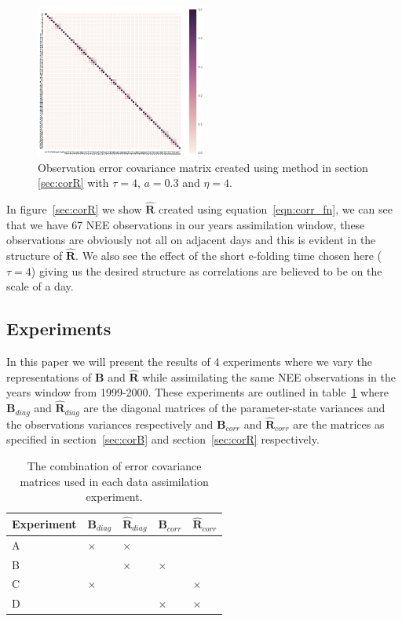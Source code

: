 \documentclass[11pt]{article}
\begin{document}
\begin{figure}[ht]
    \centering
    \includegraphics[width=0.5\textwidth]{b_edcr_corr_cor03_tau4_cutoff4_var05_rmat.png}
    \caption{Observation error covariance matrix created using method in section \ref{sec:corR} with $\tau = 4$, $a=0.3$ and $\eta=4$.}
    \label{fig:Rcorr}
\end{figure}
In figure~\ref{sec:corR} we show $\hat{\mathbf{R}}$ created using equation~\ref{eqn:corr_fn}, we can see that we have 67 NEE observations in our years assimilation window, these observations are obviously not all on adjacent days and this is evident in the structure of $\hat{\mathbf{R}}$. We also see the effect of the short e-folding time chosen here ($\tau=4$) giving us the desired structure as correlations are believed to be on the scale of a day. 

\subsection{Experiments} \label{sec:exps}

In this paper we will present the results of 4 experiments where we vary the representations of $\textbf{B}$ and $\hat{\mathbf{R}}$ while assimilating the same NEE observations in the years window from 1999-2000. These experiments are outlined in table~\ref{table:exps_tab} where $\textbf{B}_{diag}$ and $\hat{\mathbf{R}}_{diag}$ are the diagonal matrices of the parameter-state variances and the observations variances respectively and $\textbf{B}_{corr}$ and $\hat{\mathbf{R}}_{corr}$ are the matrices as specified in section~\ref{sec:corB} and section~\ref{sec:corR} respectively.

\begin{table}[ht] 
\begin{center}
	\begin{tabular}{| l | l | l | l | l |}
	\hline
	Experiment & $\textbf{B}_{diag}$ & $\hat{\mathbf{R}}_{diag}$ & $\textbf{B}_{corr}$ &
	$\hat{\mathbf{R}}_{corr}$ \\ \hline
	A & $\times$ & $\times$ & & \\ \hline
	B & & $\times$ & $\times$ & \\ \hline
	C & $\times$ & & & $\times$ \\ \hline
	D & & & $\times$ & $\times$ \\ 
	\hline
	\end{tabular}
	\caption{The combination of error covariance matrices used in each data assimilation experiment.}
	\label{table:exps_tab}
\end{center} 
\end{table}
\end{document}
